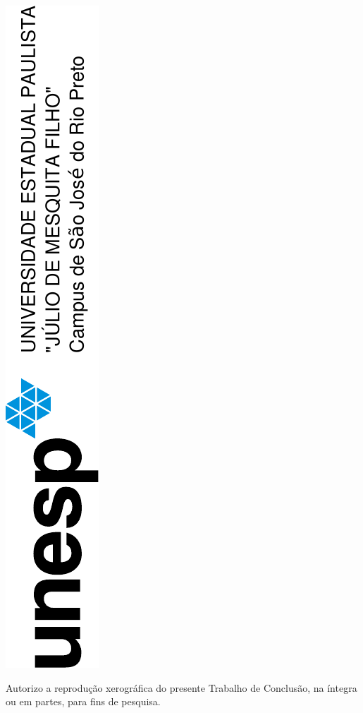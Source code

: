 \thispagestyle{empty}
\center
\centering \includegraphics[angle=-90]{unesp.pdf}
\vspace{2cm}

\begin{vplace}[1]
\par \centering {} 
\end{vplace}

\begin{vplace}[1]
	\par Autorizo a reprodução xerográfica do presente Trabalho de Conclusão, na íntegra ou em partes, para fins de pesquisa.
\end{vplace}

\begin{vplace}[1]
	\imprimirlocal

	\begin{center}
		\assinatura{\imprimirautor}
	\end{center}
\end{vplace}



